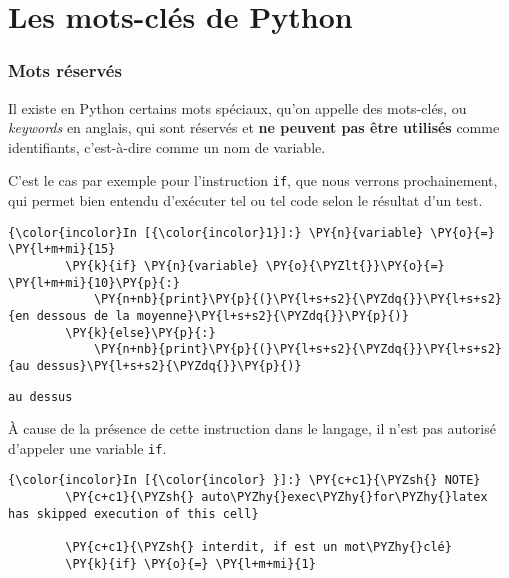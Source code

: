     
    
    
    

    

    \hypertarget{les-mots-cluxe9s-de-python}{%
\section{Les mots-clés de Python}\label{les-mots-cluxe9s-de-python}}

    \hypertarget{mots-ruxe9servuxe9s}{%
\subsubsection{Mots réservés}\label{mots-ruxe9servuxe9s}}

    Il existe en Python certains mots spéciaux, qu'on appelle des mots-clés,
ou \emph{keywords} en anglais, qui sont réservés et \textbf{ne peuvent
pas être utilisés} comme identifiants, c'est-à-dire comme un nom de
variable.

    C'est le cas par exemple pour l'instruction \texttt{if}, que nous
verrons prochainement, qui permet bien entendu d'exécuter tel ou tel
code selon le résultat d'un test.

    \begin{Verbatim}[commandchars=\\\{\},frame=single,framerule=0.3mm,rulecolor=\color{cellframecolor}]
{\color{incolor}In [{\color{incolor}1}]:} \PY{n}{variable} \PY{o}{=} \PY{l+m+mi}{15}
        \PY{k}{if} \PY{n}{variable} \PY{o}{\PYZlt{}}\PY{o}{=} \PY{l+m+mi}{10}\PY{p}{:}
            \PY{n+nb}{print}\PY{p}{(}\PY{l+s+s2}{\PYZdq{}}\PY{l+s+s2}{en dessous de la moyenne}\PY{l+s+s2}{\PYZdq{}}\PY{p}{)}
        \PY{k}{else}\PY{p}{:}
            \PY{n+nb}{print}\PY{p}{(}\PY{l+s+s2}{\PYZdq{}}\PY{l+s+s2}{au dessus}\PY{l+s+s2}{\PYZdq{}}\PY{p}{)}
\end{Verbatim}


    \begin{Verbatim}[commandchars=\\\{\},frame=single,framerule=0.3mm,rulecolor=\color{cellframecolor}]
au dessus
\end{Verbatim}

    À cause de la présence de cette instruction dans le langage, il n'est
pas autorisé d'appeler une variable \texttt{if}.

    \begin{Verbatim}[commandchars=\\\{\},frame=single,framerule=0.3mm,rulecolor=\color{cellframecolor}]
{\color{incolor}In [{\color{incolor} }]:} \PY{c+c1}{\PYZsh{} NOTE}
        \PY{c+c1}{\PYZsh{} auto\PYZhy{}exec\PYZhy{}for\PYZhy{}latex has skipped execution of this cell}
        
        \PY{c+c1}{\PYZsh{} interdit, if est un mot\PYZhy{}clé}
        \PY{k}{if} \PY{o}{=} \PY{l+m+mi}{1}
\end{Verbatim}


